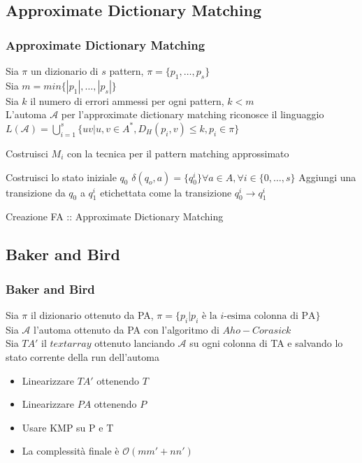 \documentclass{beamer}
\newcommand{\bigO}{\ensuremath{\mathcal{O}}} %
\begin{document}
\subsection{Approximate Dictionary Matching}
\begin{frame}
\frametitle{Approximate Dictionary Matching}

\begin{definition}
	Sia $\pi$ un dizionario di $s$ pattern, $\pi = \{p_1,\dots,p_s\}$\\
	Sia $m = min\{|p_1|,\dots,|p_s|\}$\\
	Sia $k$ il numero di errori ammessi per ogni pattern, $k < m$ \\
	L'automa $\mathcal{A}$ per l'approximate dictionary matching riconosce il linguaggio $L(\mathcal{A}) =\bigcup_{i=1}^s \{ uv | u,v\in A^*, D_H(p_i,v) \leq k, p_i\in \pi \}$
\end{definition}

\begin{algorithm}[H]
\begin{algorithmic}[1]
  \scriptsize
{}

\STATE Costruisci $M_i$ con la tecnica per il pattern matching approssimato

\ENDFOR
\STATE Costruisci lo stato iniziale $q_0$
\STATE $\delta(q_o,a) = \{q_0^i\} \forall a\in A, \forall i \in \{0,\dots,s\}$
\STATE Aggiungi una transizione da  $q_0$ a $q_1^i$ etichettata come la transizione $q_0^i \to q_1^i$
\ENDFOR

\end{algorithmic}
\caption{Creazione FA :: Approximate Dictionary Matching}
\end{algorithm}

\end{frame}



\subsection{Baker and Bird}
\begin{frame}
\frametitle{Baker and Bird}
\begin{definition}
	Sia $\pi$ il dizionario ottenuto da PA, $\pi= \{p_i | p_i \text{ è la } i \text{-esima colonna di PA}\}$\\
	Sia $\mathcal{A}$ l'automa ottenuto da PA con l'algoritmo di $Aho-Corasick$\\
	Sia $TA'$ il $text array$ ottenuto lanciando $\mathcal{A}$ su ogni colonna di TA e salvando lo stato corrente della run dell'automa
\end{definition}

\begin{itemize}
\item Linearizzare $TA'$ ottenendo $T$
\item Linearizzare $PA$ ottenendo $P$
\item Usare KMP su P e T
\item La complessità finale è  \bigO{$(mm' + nn')$} 
\end{itemize}


\end{frame}
\end{document}
